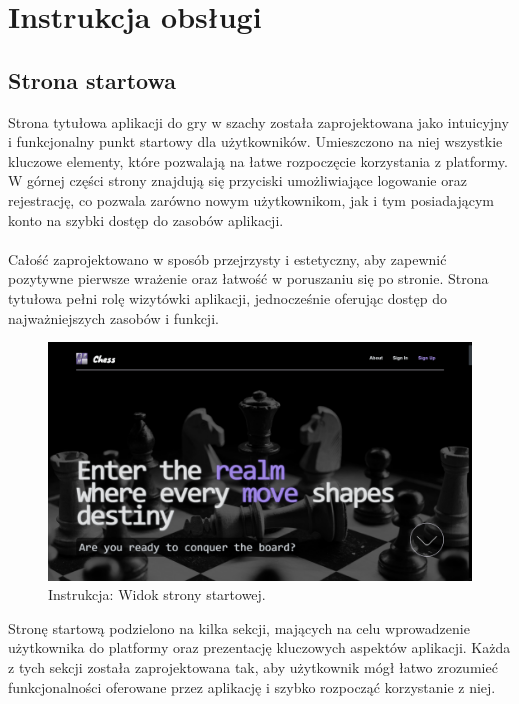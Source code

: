 \documentclass[12pt,a4paper]{article}
\begin{document}
\newpage

\section{Instrukcja obsługi}
\subsection{Strona startowa}
Strona tytułowa aplikacji do gry w szachy została zaprojektowana jako intuicyjny i funkcjonalny punkt startowy dla użytkowników. Umieszczono na niej wszystkie kluczowe elementy, które pozwalają na łatwe rozpoczęcie korzystania z platformy. W górnej części strony znajdują się przyciski umożliwiające logowanie oraz rejestrację, co pozwala zarówno nowym użytkownikom, jak i tym posiadającym konto na szybki dostęp do zasobów aplikacji.
\\\\
Całość zaprojektowano w sposób przejrzysty i estetyczny, aby zapewnić pozytywne pierwsze wrażenie oraz łatwość w poruszaniu się po stronie. Strona tytułowa pełni rolę wizytówki aplikacji, jednocześnie oferując dostęp do najważniejszych zasobów i funkcji.

\vspace{0.5cm}
\begin{figure}[h!]
    \centering
    \includegraphics[width=1\textwidth]{images/ins_hero.png}
    \caption{Instrukcja: Widok strony startowej.}
\end{figure}
\vspace{0.5cm}

\noindent
Stronę startową podzielono na kilka sekcji, mających na celu wprowadzenie użytkownika do platformy oraz prezentację kluczowych aspektów aplikacji. Każda z tych sekcji została zaprojektowana tak, aby użytkownik mógł łatwo zrozumieć funkcjonalności oferowane przez aplikację i szybko rozpocząć korzystanie z niej.
\end{document}
